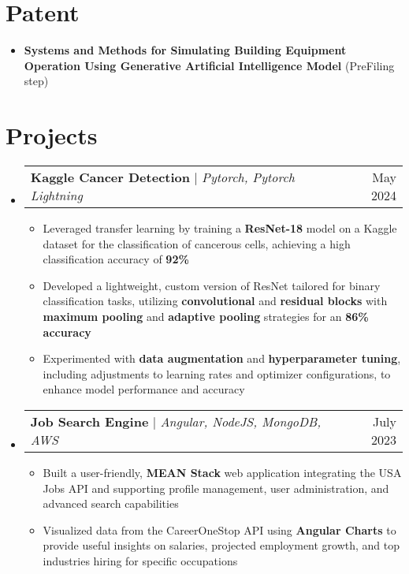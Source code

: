 \documentclass[letterpaper,11pt]{article}
\makeatletter
\newcommand{\resumeItem}[1]{
  \item\small{
    {#1 \vspace{-2pt}}
  }
}
\newcommand{\resumeSubSubheading}[2]{
    \item
    \begin{tabular*}{0.97\textwidth}{l@{\extracolsep{\fill}}r}
      \textit{\small#1} & \textit{\small #2} \\
    \end{tabular*}\vspace{-7pt}
}
\newcommand{\resumeProjectHeading}[2]{
    \item
    \begin{tabular*}{0.97\textwidth}{l@{\extracolsep{\fill}}r}
      \small#1 & #2 \\
    \end{tabular*}\vspace{-7pt}
}
\newcommand{\resumeSubHeadingListStart}{\begin{itemize}[leftmargin=0.15in, label={}]}
\newcommand{\resumeSubHeadingListEnd}{\end{itemize}}
\newcommand{\resumeItemListStart}{\begin{itemize}}
\newcommand{\resumeItemListEnd}{\end{itemize}\vspace{-5pt}}
\makeatother
\begin{document}

\section{Patent}
  \resumeSubHeadingListStart
    \resumeItem{\textbf{Systems and Methods for Simulating Building Equipment Operation Using Generative Artificial Intelligence Model} (PreFiling step)}
  \resumeSubHeadingListEnd


\section{Projects}
    \resumeSubHeadingListStart         
    \resumeProjectHeading
    {\textbf{Kaggle Cancer Detection} $|$ \emph{Pytorch, Pytorch Lightning}} {May 2024}
      \resumeItemListStart
        \resumeItem{Leveraged transfer learning by training a \textbf{ResNet-18} model on a Kaggle dataset for the classification of cancerous cells, achieving a high classification accuracy of \textbf{92\%}}
        \resumeItem{Developed a lightweight, custom version of ResNet tailored for binary classification tasks, utilizing \textbf{convolutional} and \textbf{residual blocks} with \textbf{maximum pooling} and \textbf{adaptive pooling} strategies for an \textbf{86\% accuracy}}
        \resumeItem{Experimented with \textbf{data augmentation} and \textbf{hyperparameter tuning}, including adjustments to learning rates and optimizer configurations, to enhance model performance and accuracy}
      \resumeItemListEnd
    
    \resumeProjectHeading
      {\textbf{Job Search Engine} $|$ \emph{Angular, NodeJS, MongoDB, AWS}}{July 2023}
      \resumeItemListStart
        \resumeItem{Built a user-friendly, \textbf{MEAN Stack} web application integrating the USA Jobs API and supporting profile management, user administration, and advanced search capabilities}
        \resumeItem{Visualized data from the CareerOneStop API using \textbf{Angular Charts} to provide useful insights on salaries, projected employment growth, and top industries hiring for specific occupations}
      \resumeItemListEnd
      \resumeSubHeadingListEnd
\end{document}
